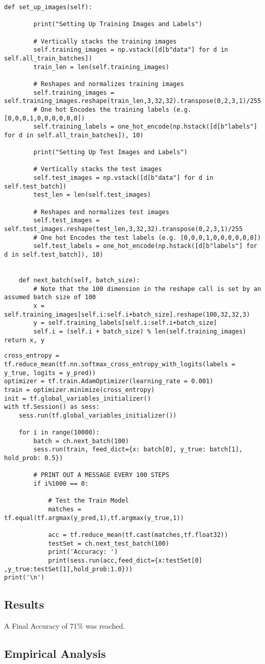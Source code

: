 \begin{lstlisting}
def set_up_images(self):
        
        print("Setting Up Training Images and Labels")
        
        # Vertically stacks the training images
        self.training_images = np.vstack([d[b"data"] for d in self.all_train_batches])
        train_len = len(self.training_images)
        
        # Reshapes and normalizes training images
        self.training_images = self.training_images.reshape(train_len,3,32,32).transpose(0,2,3,1)/255
        # One hot Encodes the training labels (e.g. [0,0,0,1,0,0,0,0,0,0])
        self.training_labels = one_hot_encode(np.hstack([d[b"labels"] for d in self.all_train_batches]), 10)
        
        print("Setting Up Test Images and Labels")
        
        # Vertically stacks the test images
        self.test_images = np.vstack([d[b"data"] for d in self.test_batch])
        test_len = len(self.test_images)
        
        # Reshapes and normalizes test images
        self.test_images = self.test_images.reshape(test_len,3,32,32).transpose(0,2,3,1)/255
        # One hot Encodes the test labels (e.g. [0,0,0,1,0,0,0,0,0,0])
        self.test_labels = one_hot_encode(np.hstack([d[b"labels"] for d in self.test_batch]), 10)

        
    def next_batch(self, batch_size):
        # Note that the 100 dimension in the reshape call is set by an assumed batch size of 100
        x = self.training_images[self.i:self.i+batch_size].reshape(100,32,32,3)
        y = self.training_labels[self.i:self.i+batch_size]
        self.i = (self.i + batch_size) % len(self.training_images)
return x, y
\end{lstlisting}

\begin{lstlisting}
cross_entropy = tf.reduce_mean(tf.nn.softmax_cross_entropy_with_logits(labels = y_true, logits = y_pred))
optimizer = tf.train.AdamOptimizer(learning_rate = 0.001)
train = optimizer.minimize(cross_entropy)
init = tf.global_variables_initializer()
with tf.Session() as sess:
    sess.run(tf.global_variables_initializer())

    for i in range(10000):
        batch = ch.next_batch(100)
        sess.run(train, feed_dict={x: batch[0], y_true: batch[1], hold_prob: 0.5})
        
        # PRINT OUT A MESSAGE EVERY 100 STEPS
        if i%1000 == 0:
            
            # Test the Train Model
            matches = tf.equal(tf.argmax(y_pred,1),tf.argmax(y_true,1))

            acc = tf.reduce_mean(tf.cast(matches,tf.float32))
            testSet = ch.next_test_batch(100)
            print('Accuracy: ')
            print(sess.run(acc,feed_dict={x:testSet[0] ,y_true:testSet[1],hold_prob:1.0}))
print('\n')
\end{lstlisting}

\subsection*{Results}
A Final Accuracy of 71\% was reached.

\subsection*{Empirical Analysis}
